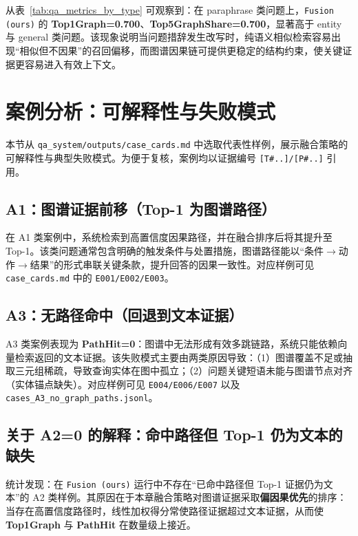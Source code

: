 从表~\ref{tab:qa_metrics_by_type} 可观察到：在 paraphrase 类问题上，\texttt{Fusion (ours)} 的 \textbf{Top1Graph=0.700}、\textbf{Top5GraphShare=0.700}，显著高于 entity 与 general 类问题。该现象说明当问题措辞发生改写时，纯语义相似检索容易出现“相似但不因果”的召回偏移，而图谱因果链可提供更稳定的结构约束，使关键证据更容易进入有效上下文。

\section{案例分析：可解释性与失败模式}
\label{sec:case_study}

本节从 \texttt{qa\_system/outputs/case\_cards.md} 中选取代表性样例，展示融合策略的可解释性与典型失败模式。为便于复核，案例均以证据编号 \texttt{[T\#..]/[P\#..]} 引用。

\subsection{A1：图谱证据前移（Top-1 为图谱路径）}
\label{subsec:case_A1}

在 A1 类案例中，系统检索到高置信度因果路径，并在融合排序后将其提升至 Top-1。该类问题通常包含明确的触发条件与处置措施，图谱路径能以“条件$\rightarrow$动作$\rightarrow$结果”的形式串联关键条款，提升回答的因果一致性。对应样例可见 \texttt{case\_cards.md} 中的 \texttt{E001/E002/E003}。

\subsection{A3：无路径命中（回退到文本证据）}
\label{subsec:case_A3}

A3 类案例表现为 \textbf{PathHit=0}：图谱中无法形成有效多跳链路，系统只能依赖向量检索返回的文本证据。该失败模式主要由两类原因导致：（1）图谱覆盖不足或抽取三元组稀疏，导致查询实体在图中孤立；（2）问题关键短语未能与图谱节点对齐（实体锚点缺失）。对应样例可见 \texttt{E004/E006/E007} 以及 \texttt{cases\_A3\_no\_graph\_paths.jsonl}。

\subsection{关于 A2=0 的解释：命中路径但 Top-1 仍为文本的缺失}
\label{subsec:case_A2}

统计发现：在 \texttt{Fusion (ours)} 运行中不存在“已命中路径但 Top-1 证据仍为文本”的 A2 类样例。其原因在于本章融合策略对图谱证据采取\textbf{偏因果优先}的排序：当存在高置信度路径时，线性加权得分常使路径证据超过文本证据，从而使 \textbf{Top1Graph} 与 \textbf{PathHit} 在数量级上接近。

